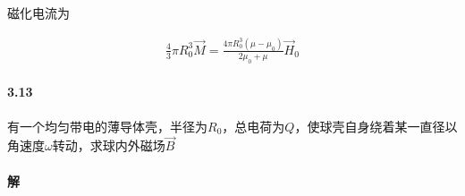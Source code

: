 \documentclass{article}
\begin{document}
磁化电流为

\begin{equation*}
  \begin{aligned}
    \frac{4}{3} \pi R_0^3 \vec{M} = \frac{4 \pi R_0^3 \left( \mu - \mu_0 \right)}{2\mu_{0} + \mu} \vec{H}_0
  \end{aligned}
\end{equation*}

\paragraph{3.13}

有一个均匀带电的薄导体壳，半径为$R_0$，总电荷为$Q$，使球壳自身绕着某一直径以角速度$\omega$转动，求球内外磁场$\vec{B}$

\paragraph{解}
\end{document}
